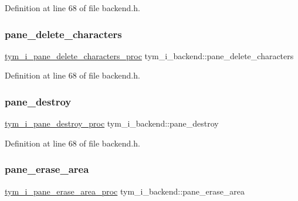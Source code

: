 Definition at line 68 of file backend.\+h.

\mbox{\label{structtym__i__backend_a7c0e3c008f7c54c8c6f232cdde226a38}} 
\subsubsection{\texorpdfstring{pane\+\_\+delete\+\_\+characters}{pane\_delete\_characters}}
{\footnotesize\ttfamily \hyperlink{backend_8h_a0926d88cba57a1e598f92df346d9d6a3}{tym\+\_\+i\+\_\+pane\+\_\+delete\+\_\+characters\+\_\+proc} tym\+\_\+i\+\_\+backend\+::pane\+\_\+delete\+\_\+characters}



Definition at line 68 of file backend.\+h.

\mbox{\label{structtym__i__backend_a26f012c047a54997dbfd52868c723fe5}} 
\subsubsection{\texorpdfstring{pane\+\_\+destroy}{pane\_destroy}}
{\footnotesize\ttfamily \hyperlink{backend_8h_a7c52fa9848f5daacdca285c8e25c6daf}{tym\+\_\+i\+\_\+pane\+\_\+destroy\+\_\+proc} tym\+\_\+i\+\_\+backend\+::pane\+\_\+destroy}



Definition at line 68 of file backend.\+h.

\mbox{\label{structtym__i__backend_a81be791bdd6da6b01bb8f85b8388707c}} 
\subsubsection{\texorpdfstring{pane\+\_\+erase\+\_\+area}{pane\_erase\_area}}
{\footnotesize\ttfamily \hyperlink{backend_8h_a61a3d2bde17cca99666001e082332bc4}{tym\+\_\+i\+\_\+pane\+\_\+erase\+\_\+area\+\_\+proc} tym\+\_\+i\+\_\+backend\+::pane\+\_\+erase\+\_\+area}



